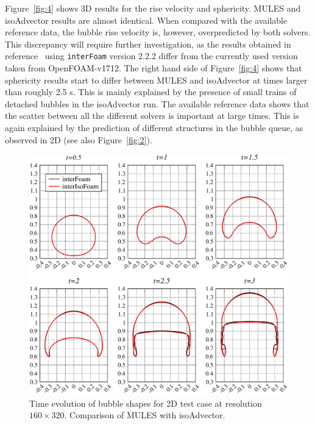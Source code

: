 \documentclass[review]{elsarticle}
\begin{document}
Figure~\ref{fig:4} shows 3D results for the rise velocity and sphericity. MULES and isoAdvector 
results are almost identical. When compared with the available reference data, the bubble rise velocity is, however, overpredicted by both solvers. 
This discrepancy will require further investigation, as the results obtained in reference~\cite{Adelsberger2014} using \verb+interFoam+ version 2.2.2 differ from the currently used version taken from OpenFOAM-v1712.
The right hand side of Figure~\ref{fig:4} shows that sphericity results start to differ between 
MULES and isoAdvector at times larger than roughly 2.5 s. This is mainly explained by the presence of small trains of detached bubbles in the isoAdvector run. The available reference data shows that the scatter between all the different solvers is important at large times. This is again explained by the prediction of different structures in the bubble queue, as observed in 2D 
(see also Figure~\ref{fig:2}).  
\begin{figure}[!h]
  \includegraphics[scale=0.45]{figures/bubble_shape2D_time_evol_160.pdf}
  \caption{Time evolution of bubble shapes for 2D test case at resolution $160\times320$. 
           Comparison of MULES with isoAdvector.}
  \label{fig:3}
\end{figure}
\end{document}
